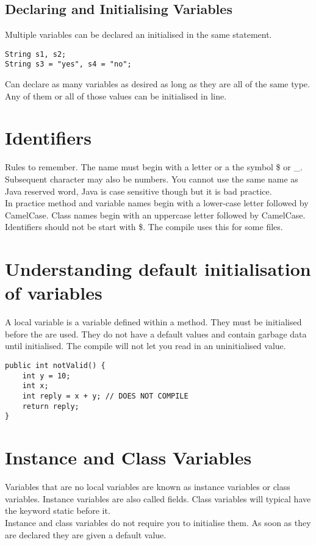 \documentclass[a4paper]{report}   %
\begin{document}
\subsection{Declaring and Initialising Variables}

Multiple variables can be declared an initialised in the same statement.
\begin{lstlisting}
String s1, s2;
String s3 = "yes", s4 = "no";
\end{lstlisting}

Can declare as many variables as desired as long as they are all of the same type. Any of them or all of those values can be initialised in line.

\section{Identifiers}

Rules to remember. The name must begin with a letter or a the symbol \$ or \_. Subsequent character may also be numbers. You cannot use the same name as Java reserved word, Java is case sensitive though but it is bad practice.\\

In practice method and variable names begin with a lower-case letter followed by CamelCase. Class names begin with an uppercase letter followed by CamelCase. Identifiers should not be start with \$. The compile uses this for some files.

\section{Understanding default initialisation of variables}

A local variable is a variable defined within a method. They must be initialised before the are used. They do not have a default values and contain garbage data until initialised. The compile will not let you read in an uninitialised value.

\begin{lstlisting}
public int notValid() {
	int y = 10;
	int x;
	int reply = x + y; // DOES NOT COMPILE
	return reply;
}
\end{lstlisting}

\section{Instance and Class Variables}
Variables that are no local variables are known as instance variables or class variables. Instance variables are also called fields. Class variables will typical have the keyword static before it.\\
Instance and class variables do not require you to initialise them. As soon as they are declared they are given a default value. 
\end{document}
